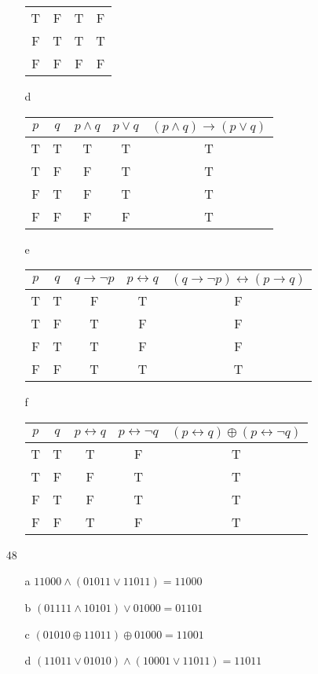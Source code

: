 \documentclass{article}
\begin{document}
\begin{itemize}
\begin{itemize}
\begin{tabular}{c | c | c | c}
          T & F & T & F \\
          F & T & T & T \\
          F & F & F & F
        \end{tabular}
      \item [d]
        \begin{tabular}{c | c | c | c | c }
          $p$ & $q$ & $p \land q$ & $p \lor q$ & $(p \land q) \rightarrow (p \lor q)$ \\
          \hline
          T & T & T & T & T \\
          T & F & F & T & T \\
          F & T & F & T & T \\
          F & F & F & F & T 
        \end{tabular}
      \item [e]
        \begin{tabular}{c | c | c | c | c}
          $p$ & $q$ & $q \rightarrow \neg p$ & $p \leftrightarrow q$ & $(q \rightarrow \neg p) \leftrightarrow (p \rightarrow q)$ \\
          \hline
          T & T & F & T & F \\
          T & F & T & F & F \\
          F & T & T & F & F \\
          F & F & T & T & T
        \end{tabular}
      \item [f]
        \begin{tabular}{c | c | c | c | c}
          $p$ & $q$ & $p \leftrightarrow q$ & $p \leftrightarrow \neg q$ & $(p \leftrightarrow q) \oplus (p \leftrightarrow \neg q)$ \\
          \hline
          T & T & T & F & T \\
          T & F & F & T & T \\
          F & T & F & T & T \\
          F & F & T & F & T
        \end{tabular}
    \end{itemize}
  \item [48]
    \begin{itemize}
      \item [a]
        $11000 \land (01011 \lor 11011) = 11000$
      \item [b]
        $(01111 \land 10101) \lor 01000 = 01101$
      \item [c]
        $(01010 \oplus 11011) \oplus 01000 = 11001$
      \item [d]
        $(11011 \lor 01010) \land (10001 \lor 11011) = 11011$
    \end{itemize}
\end{itemize}
\end{document}
